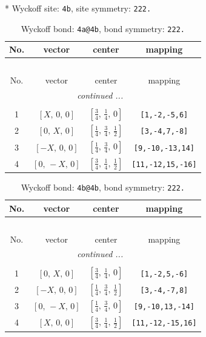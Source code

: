 \documentclass[fleqn,8pt]{jsarticle}
\begin{document}
* Wyckoff site: {\tt 4b}, site symmetry: {\tt 222.}
\renewcommand{\arraystretch}{1.2}
\begin{longtable}{cccc}
\caption{Wyckoff bond: {\tt 4a@4b}, bond symmetry: {\tt 222.}}
 \\
 \hline \hline
No. & vector & center & mapping \\ \hline \endfirsthead

\multicolumn{3}{l}{\tablename\ \thetable{}} \\
 \hline \hline
No. & vector & center & mapping \\ \hline \endhead

 \hline \hline
\multicolumn{3}{r}{\footnotesize\it continued ...} \\ \endfoot

 \hline \hline
\multicolumn{3}{r}{} \\ \endlastfoot

1 & $\left[ X,\, 0,\, 0 \right]$ & $\left[ \frac{3}{4},\, \frac{1}{4},\, 0 \right]$ & {\tt [1,-2,-5,6]} \\ \hline
2 & $\left[ 0,\, X,\, 0 \right]$ & $\left[ \frac{1}{4},\, \frac{3}{4},\, \frac{1}{2} \right]$ & {\tt [3,-4,7,-8]} \\ \hline
3 & $\left[ - X,\, 0,\, 0 \right]$ & $\left[ \frac{1}{4},\, \frac{3}{4},\, 0 \right]$ & {\tt [9,-10,-13,14]} \\ \hline
4 & $\left[ 0,\, - X,\, 0 \right]$ & $\left[ \frac{3}{4},\, \frac{1}{4},\, \frac{1}{2} \right]$ & {\tt [11,-12,15,-16]} \\
\end{longtable}
\renewcommand{\arraystretch}{1.2}
\begin{longtable}{cccc}
\caption{Wyckoff bond: {\tt 4b@4b}, bond symmetry: {\tt 222.}}
 \\
 \hline \hline
No. & vector & center & mapping \\ \hline \endfirsthead

\multicolumn{3}{l}{\tablename\ \thetable{}} \\
 \hline \hline
No. & vector & center & mapping \\ \hline \endhead

 \hline \hline
\multicolumn{3}{r}{\footnotesize\it continued ...} \\ \endfoot

 \hline \hline
\multicolumn{3}{r}{} \\ \endlastfoot

1 & $\left[ 0,\, X,\, 0 \right]$ & $\left[ \frac{3}{4},\, \frac{1}{4},\, 0 \right]$ & {\tt [1,-2,5,-6]} \\ \hline
2 & $\left[ - X,\, 0,\, 0 \right]$ & $\left[ \frac{1}{4},\, \frac{3}{4},\, \frac{1}{2} \right]$ & {\tt [3,-4,-7,8]} \\ \hline
3 & $\left[ 0,\, - X,\, 0 \right]$ & $\left[ \frac{1}{4},\, \frac{3}{4},\, 0 \right]$ & {\tt [9,-10,13,-14]} \\ \hline
4 & $\left[ X,\, 0,\, 0 \right]$ & $\left[ \frac{3}{4},\, \frac{1}{4},\, \frac{1}{2} \right]$ & {\tt [11,-12,-15,16]} \\
\end{longtable}
\end{document}
